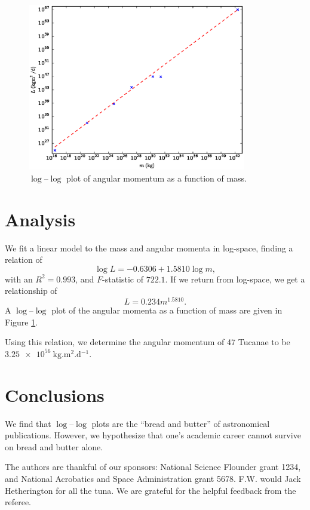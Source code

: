 \documentclass[manuscript]{aastex}
\begin{document}
\begin{figure}[b]
  \centering
  \includegraphics[width=0.85\textwidth]{m-L_log-log}
  \caption{$\log$--$\log$ plot of angular momentum as a function of mass.}
  \label{fig:m-L-log-log}
\end{figure}


\section{Analysis}

We fit a linear model to the mass and angular momenta in log-space, finding a relation of
%
\begin{equation}
  \log L = -0.6306 + 1.5810 \log m,
  \label{eq:log-log-relation}
\end{equation}
%
with an $R^2 = 0.993$, and $F$-statistic of $722.1$. If we return from log-space, we get a relationship of
%
\begin{equation}
  L = 0.234 m^{1.5810}.
  \label{eq:normal-relation}
\end{equation}
%
A $\log$--$\log$ plot of the angular momenta as a function of mass are given in Figure \ref{fig:m-L-log-log}.


Using this relation, we determine the angular momentum of 47 Tucanae to be $\SI{3.25e56}{\kilo\gram.\meter^2.\day^{-1}}$.



\section{Conclusions}

We find that $\log$--$\log$ plots are the ``bread and butter'' of astronomical publications. However, we hypothesize that one's academic career cannot survive on bread and butter alone.


\acknowledgments

The authors are thankful of our sponsors: National Science Flounder grant 1234, and National Acrobatics and Space Administration grant 5678. F.W. would Jack Hetherington for all the tuna. We are grateful for the helpful feedback from the referee.
\end{document}

